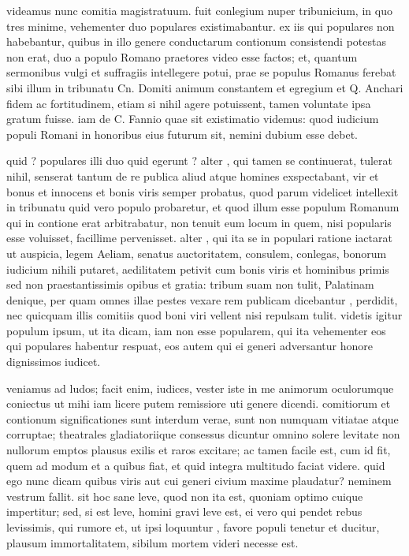  videamus nunc comitia magistratuum. fuit conlegium nuper tribunicium, in quo tres minime, vehementer duo populares existimabantur. ex iis qui populares non habebantur, quibus in illo genere conductarum contionum consistendi potestas non erat, duo a populo Romano praetores video esse factos; et, quantum sermonibus vulgi et suffragiis intellegere potui, prae se populus Romanus ferebat sibi illum in tribunatu Cn. Domiti animum constantem et egregium et Q. Anchari fidem ac fortitudinem, etiam si nihil agere potuissent, tamen voluntate ipsa gratum fuisse. iam de C. Fannio quae sit existimatio videmus: quod iudicium populi Romani in honoribus eius futurum sit, nemini dubium esse debet.

 quid ? populares illi duo quid egerunt ? alter , qui tamen se continuerat, tulerat nihil, senserat tantum de re publica aliud atque homines exspectabant, vir et bonus et innocens et bonis viris semper probatus, quod parum videlicet intellexit in tribunatu quid vero populo probaretur, et quod illum esse populum Romanum qui in contione erat arbitrabatur, non tenuit eum locum in quem, nisi popularis esse voluisset, facillime pervenisset. alter , qui ita se in populari ratione iactarat ut auspicia, legem Aeliam, senatus auctoritatem, consulem, conlegas, bonorum iudicium nihili putaret, aedilitatem petivit cum bonis viris et hominibus primis sed non praestantissimis opibus et gratia: tribum suam non tulit, Palatinam denique, per quam omnes illae pestes vexare rem publicam dicebantur , perdidit, nec quicquam illis comitiis quod boni viri vellent nisi repulsam tulit. videtis igitur populum ipsum, ut ita dicam, iam non esse popularem, qui ita vehementer eos qui populares habentur respuat, eos autem qui ei generi adversantur honore dignissimos iudicet.

 veniamus ad ludos; facit enim, iudices, vester iste in me animorum oculorumque coniectus ut mihi iam licere putem remissiore uti genere dicendi. comitiorum et contionum significationes sunt interdum verae, sunt non numquam vitiatae atque corruptae; theatrales gladiatoriique consessus dicuntur omnino solere levitate non nullorum emptos plausus exilis et raros excitare; ac tamen facile est, cum id fit, quem ad modum et a quibus fiat, et quid integra multitudo faciat videre. quid ego nunc dicam quibus viris aut cui generi civium maxime plaudatur? neminem vestrum fallit. sit hoc sane leve, quod non ita est, quoniam optimo cuique impertitur; sed, si est leve, homini gravi leve est, ei vero qui pendet rebus levissimis, qui rumore et, ut ipsi loquuntur , favore populi tenetur et ducitur, plausum immortalitatem, sibilum mortem videri necesse est.

